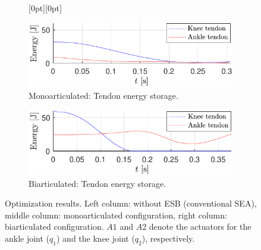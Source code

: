 \documentclass[letterpaper, 10 pt, conference]{ieeeconf}  %
\begin{document}
\begin{figure}[ht]
	\begin{subfigure}[t]{0.32\linewidth}
		\centering
		\raisebox{0pt}[0pt][0pt]{%
		}
	\end{subfigure}
	\begin{subfigure}[t]{0.32\linewidth}
		\includegraphics[width=\linewidth]{mono/ESB_storage}
		\caption{Monoarticulated: Tendon energy storage.}
		\label{fig:mono_ESB}
	\end{subfigure}
	\begin{subfigure}[t]{0.32\linewidth}
		\includegraphics[width=\linewidth]{bi/ESB_storage}
		\caption{Biarticulated: Tendon energy storage.}
		\label{fig:bi_ESB}
	\end{subfigure}
	
	\caption{Optimization results. Left column: without ESB (conventional SEA), middle column: monoarticulated configuration, right column: biarticulated configuration. $A1$ and $A2$ denote the actuators for the ankle joint ($q_1$) and the knee joint ($q_2$), respectively.}
	\label{fig:opt_results}
\end{figure}


\end{document}

